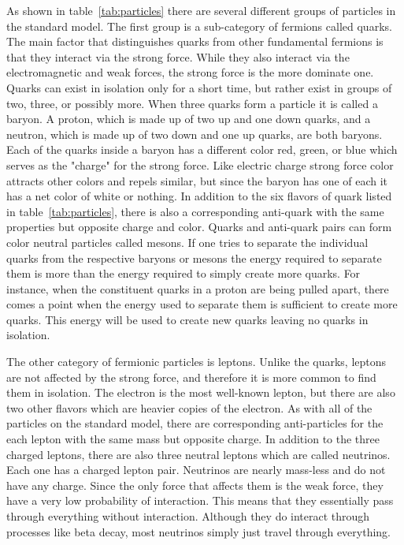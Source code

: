 As shown in table~\ref{tab:particles} there are several different groups of particles in the standard model. The first group is a sub-category of fermions called quarks. The main factor that distinguishes quarks from other fundamental fermions is that they interact via the strong force. While they also interact via the electromagnetic and weak forces, the strong force is the more dominate one. Quarks can exist in isolation only for a short time, but rather exist in groups of two, three, or possibly more. When three quarks form a particle it is called a baryon. A proton, which is made up of two up and one down quarks, and a neutron, which is made up of two down and one up quarks, are both baryons. Each of the quarks inside a baryon has a different color red, green, or blue which serves as the "charge" for the strong force. Like electric charge strong force color attracts other colors and repels similar, but since the baryon has one of each it has a net color of white or nothing. In addition to the six flavors of quark listed in table~\ref{tab:particles}, there is also a corresponding anti-quark with the same properties but opposite charge and color. Quarks and anti-quark pairs can form color neutral particles called mesons. If one tries to separate the individual quarks from the respective baryons or mesons the energy required to separate them is more than the energy required to simply create more quarks. For instance, when the constituent quarks in a proton are being pulled apart, there comes a point when the energy used to separate them is sufficient to create more quarks. This energy will be used to create new quarks leaving no quarks in isolation.

The other category of fermionic particles is leptons. Unlike the quarks, leptons are not affected by the strong force, and therefore it is more common to find them in isolation. The electron is the most well-known lepton, but there are also two other flavors which are heavier copies of the electron. As with all of the particles on the standard model, there are corresponding anti-particles for the each lepton with the same mass but opposite charge. In addition to the three charged leptons, there are also three neutral leptons which are called neutrinos. Each one has a charged lepton pair. Neutrinos are nearly mass-less and do not have any charge. Since the only force that affects them is the weak force, they have a very low probability of interaction. This means that they essentially pass through everything without interaction. Although they do interact through processes like beta decay, most neutrinos simply just travel through everything. 

